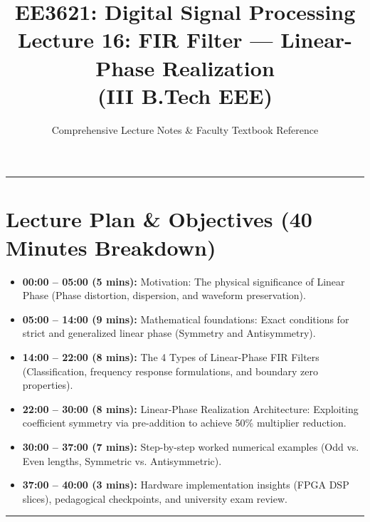 \documentclass[11pt,a4paper]{article}
\title{\textbf{EE3621: Digital Signal Processing} \\ \Large Lecture 16: FIR Filter — Linear-Phase Realization \\ \large (III B.Tech EEE)}
\author{Comprehensive Lecture Notes \& Faculty Textbook Reference}
\date{}
\begin{document}
\maketitle

\noindent\rule{\textwidth}{0.5pt}

\section{Lecture Plan \& Objectives (40 Minutes Breakdown)}
\begin{itemize}
    \item \textbf{00:00 -- 05:00 (5 mins):} Motivation: The physical significance of Linear Phase (Phase distortion, dispersion, and waveform preservation).
    \item \textbf{05:00 -- 14:00 (9 mins):} Mathematical foundations: Exact conditions for strict and generalized linear phase (Symmetry and Antisymmetry).
    \item \textbf{14:00 -- 22:00 (8 mins):} The 4 Types of Linear-Phase FIR Filters (Classification, frequency response formulations, and boundary zero properties).
    \item \textbf{22:00 -- 30:00 (8 mins):} Linear-Phase Realization Architecture: Exploiting coefficient symmetry via pre-addition to achieve 50\% multiplier reduction.
    \item \textbf{30:00 -- 37:00 (7 mins):} Step-by-step worked numerical examples (Odd vs. Even lengths, Symmetric vs. Antisymmetric).
    \item \textbf{37:00 -- 40:00 (3 mins):} Hardware implementation insights (FPGA DSP slices), pedagogical checkpoints, and university exam review.
\end{itemize}

\noindent\rule{\textwidth}{0.5pt}
\end{document}
